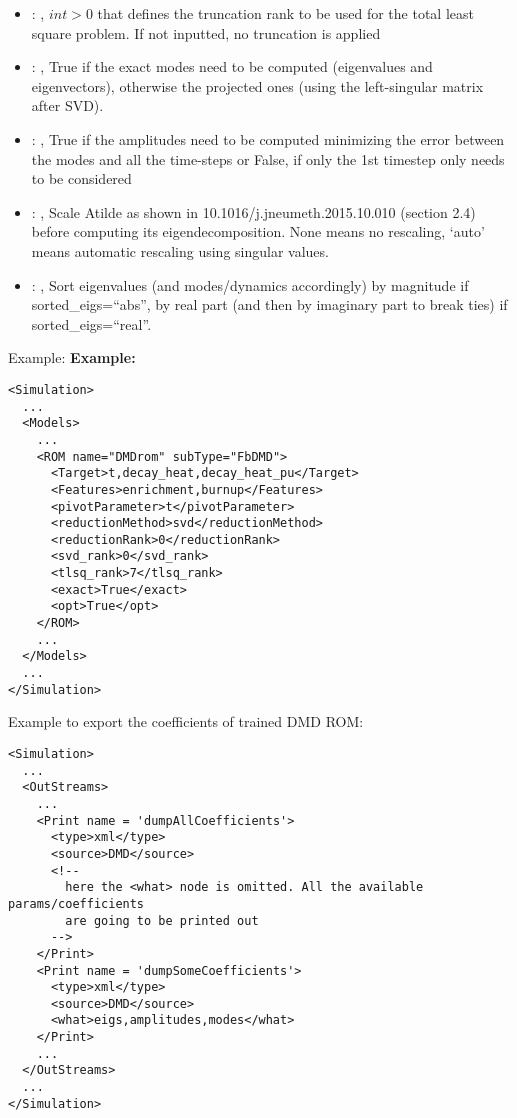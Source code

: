 \begin{itemize}
    \item {}: , 
      $int > 0$ that defines the truncation rank to be used for the total
      least square problem. If not inputted, no truncation is applied

    \item {}: , 
      True if the exact modes need to be computed (eigenvalues and
      eigenvectors),   otherwise the projected ones (using the left-singular matrix after SVD).

    \item {}: , 
      True if the amplitudes need to be computed minimizing the error
      between the modes and all the time-steps or False, if only the 1st timestep only needs to be
      considered

    \item {}: , 
      Scale Atilde as shown in 10.1016/j.jneumeth.2015.10.010 (section 2.4) before computing its
      eigendecomposition. None means no rescaling, ‘auto’ means automatic rescaling using singular
      values.

    \item {}: , 
      Sort eigenvalues (and modes/dynamics accordingly) by magnitude if sorted\_eigs=``abs'',
      by real part (and then by imaginary part to break ties) if sorted\_eigs=``real''.
  \end{itemize}

\hspace{24pt}
Example:
\textbf{Example:}
\begin{lstlisting}[style=XML,morekeywords={name,subType}]
<Simulation>
  ...
  <Models>
    ...
    <ROM name="DMDrom" subType="FbDMD">
      <Target>t,decay_heat,decay_heat_pu</Target>
      <Features>enrichment,burnup</Features>
      <pivotParameter>t</pivotParameter>
      <reductionMethod>svd</reductionMethod>
      <reductionRank>0</reductionRank>
      <svd_rank>0</svd_rank>
      <tlsq_rank>7</tlsq_rank>
      <exact>True</exact>
      <opt>True</opt>
    </ROM>
    ...
  </Models>
  ...
</Simulation>
\end{lstlisting}

Example to export the coefficients of trained DMD ROM:
\begin{lstlisting}[style=XML,morekeywords={name,subType}]
<Simulation>
  ...
  <OutStreams>
    ...
    <Print name = 'dumpAllCoefficients'>
      <type>xml</type>
      <source>DMD</source>
      <!--
        here the <what> node is omitted. All the available params/coefficients
        are going to be printed out
      -->
    </Print>
    <Print name = 'dumpSomeCoefficients'>
      <type>xml</type>
      <source>DMD</source>
      <what>eigs,amplitudes,modes</what>
    </Print>
    ...
  </OutStreams>
  ...
</Simulation>
\end{lstlisting}


